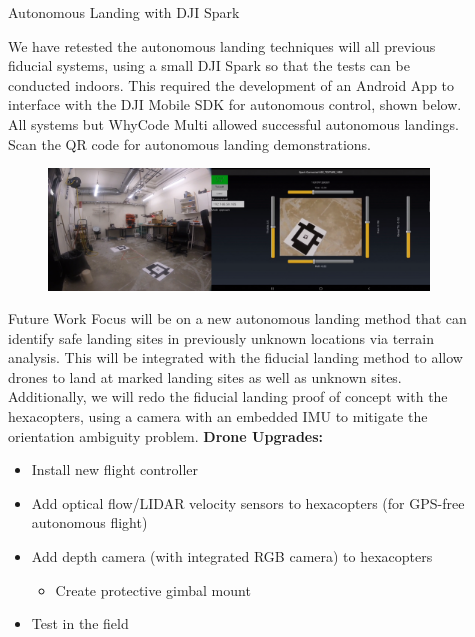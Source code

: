 \documentclass[final, 20pt]{beamer}
\newlength{\sepwidth}
\newlength{\colwidth}
\newcommand{\separatorcolumn}{\begin{column}{\sepwidth}\end{column}}
\begin{document}
\begin{frame}[t]
\begin{columns}[t]
\begin{column}{\colwidth}
\end{column}

\separatorcolumn

\begin{column}{\colwidth}

  \begin{alertblock}{Autonomous Landing with DJI Spark}

    We have retested the autonomous landing techniques will all previous fiducial systems, using a small DJI Spark
      so that the tests can be conducted indoors.
      This required the development of an Android App to interface with the DJI Mobile SDK for autonomous control, shown below.
      All systems but WhyCode Multi allowed successful autonomous landings.
      Scan the QR code for autonomous landing demonstrations.
      \begin{figure}
          \centering
          \includegraphics[width=\linewidth]{images/demo_screenshot}
      \end{figure}

  \end{alertblock}

  \begin{block}{Future Work}
      Focus will be on a new autonomous landing method that can identify safe landing sites in previously unknown locations via terrain analysis.
      This will be integrated with the fiducial landing method to allow drones to land at marked landing sites as well as unknown sites.
      Additionally, we will redo the fiducial landing proof of concept with the hexacopters, using a camera with an embedded IMU to mitigate the orientation ambiguity problem.
      \textbf{Drone Upgrades:}
      \vspace*{-0.25cm}
      \begin{itemize}
          \item Install new flight controller
          \item Add optical flow/LIDAR velocity sensors to hexacopters (for GPS-free autonomous flight)
          \item Add depth camera (with integrated RGB camera) to hexacopters
          \begin{itemize}
              \item Create protective gimbal mount
          \end{itemize}
          \item Test in the field
      \end{itemize}


\end{block}
\end{column}
\end{columns}
\end{frame}
\end{document}
